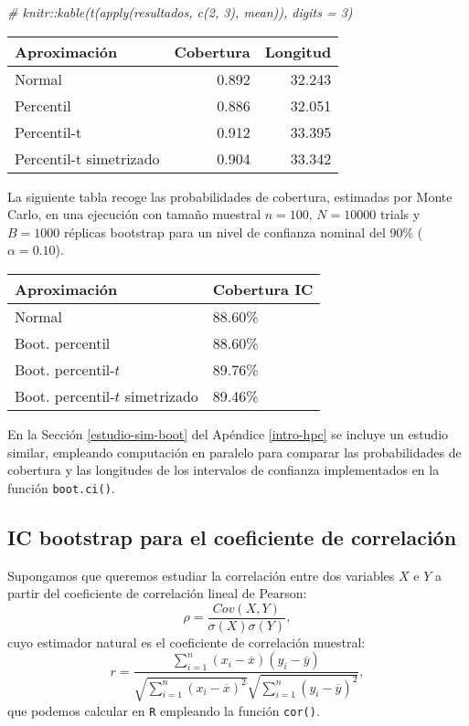 \documentclass[
]{book}
\newenvironment{Shaded}{\begin{snugshade}}{\end{snugshade}}
\newcommand{\CommentTok}[1]{\textcolor[rgb]{0.56,0.35,0.01}{\textit{#1}}}
\theoremstyle{break}
\theoremstyle{definition}
\theoremstyle{definition}
\theoremstyle{definition}
\theoremstyle{remark}
\begin{document}
\begin{Shaded}
\begin{Highlighting}[]
\CommentTok{# knitr::kable(t(apply(resultados, c(2, 3), mean)), digits = 3)}
\end{Highlighting}
\end{Shaded}

\begin{longtable}[]{@{}lrr@{}}
\toprule
Aproximación & Cobertura & Longitud\tabularnewline
\midrule
\endhead
Normal & 0.892 & 32.243\tabularnewline
Percentil & 0.886 & 32.051\tabularnewline
Percentil-t & 0.912 & 33.395\tabularnewline
Percentil-t simetrizado & 0.904 & 33.342\tabularnewline
\bottomrule
\end{longtable}

La siguiente tabla recoge las probabilidades de cobertura, estimadas por
Monte Carlo, en una ejecución con tamaño muestral \(n=100\), \(N=10000\)
trials y \(B=1000\) réplicas bootstrap para un nivel de confianza nominal
del 90\% (\(\alpha =0.10\)).

\begin{longtable}[]{@{}ll@{}}
\toprule
Aproximación & Cobertura IC\tabularnewline
\midrule
\endhead
Normal & 88.60\%\tabularnewline
Boot. percentil & 88.60\%\tabularnewline
Boot. percentil-\(t\) & 89.76\%\tabularnewline
Boot. percentil-\(t\) simetrizado & 89.46\%\tabularnewline
\bottomrule
\end{longtable}

En la Sección \ref{estudio-sim-boot} del Apéndice \ref{intro-hpc} se incluye un estudio similar, empleando computación en paralelo para comparar las probabilidades de cobertura y las longitudes de los intervalos de confianza implementados en la función \texttt{boot.ci()}.

\hypertarget{icboot-trans}{%
\subsection{IC bootstrap para el coeficiente de correlación}\label{icboot-trans}}

Supongamos que queremos estudiar la correlación entre dos variables \(X\) e \(Y\) a partir del coeficiente de correlación lineal de Pearson:
\[\rho =\frac{ Cov \left( X, Y \right) }
{ \sigma \left( X \right) \sigma \left( Y \right) },\]
cuyo estimador natural es el coeficiente de correlación muestral:
\[r=\frac{\sum_{i=1}^{n}(x_i-\overline{x})(y_i-\overline{y})}
{\sqrt{ \sum_{i=1}^{n}(x_i-\overline{x})^{2}} 
\sqrt{\sum_{i=1}^{n}(y_i-\overline{y})^{2}}},\]
que podemos calcular en \texttt{R} empleando la función \texttt{cor()}.
\end{document}
